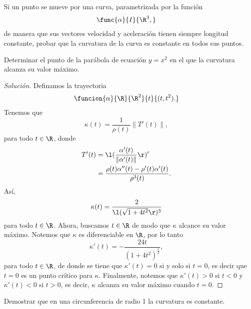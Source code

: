 \documentclass[a4,11pt]{aleph-notas}
\begin{document}
\begin{ejer}
Si un punto se mueve por una curva, parametrizada por la función
    \[
        \func{\alpha}{I}{\R^3,}
    \]
    de manera que sus vectores velocidad y aceleración tienen siempre longitud constante, probar que la curvatura de la curva es constante en todos sus puntos.
\end{ejer}

\begin{ejer}
Determinar el punto de la parábola de ecuación $y=x^2$ en el que la curvatura alcanza su valor máximo.
\end{ejer}

\begin{proof}[Solución]
Definamos la trayectoria
    \[
        \funcion{\alpha}{\R}{\R^2}{t}{(t,t^2).}
    \]
    Tenemos que
    \[
        \kappa(t)=\frac{1}{\rho(t)}\|T'(t)\|,
    \]
    para todo $t\in\R$, donde
    \begin{align*}
        T'(t)
            & = \l(\frac{\alpha'(t)}{\|\alpha'(t)\|}\r)' \\
            & = \frac{\rho(t)\alpha''(t)-\rho'(t)\alpha'(t)}{\rho^3(t)}.
    \end{align*}
    Así,
    \[
        \kappa(t)=\frac{2}{\l(\sqrt{1+4t^2}\r)^3}
    \]
    para todo $t\in\R$.
    Ahora, buscamos $t\in\R$ de modo que $\kappa$ alcance su valor máximo. Notemos que $\kappa$ es diferenciable en $\R$, por lo tanto
    \[
        \kappa'(t)=-\frac{24t}{(1+4t^2)^\frac{5}{2}},
    \]
    para todo $t\in\R$, de donde se tiene que $\kappa'(t)=0$ si y solo si $t=0$, es decir que $t=0$ es un punto crítico para $\kappa$. Finalmente, notemos que $\kappa'(t)>0$ si $t<0$ y $\kappa'(t)<0$ si $t>0$, es decir, $\kappa$ alcanza su valor máximo cuando $t=0$.
\end{proof}

\begin{ejer}
Demostrar que en una circunferencia de radio 1 la curvatura es constante.
\end{ejer}
\end{document}

